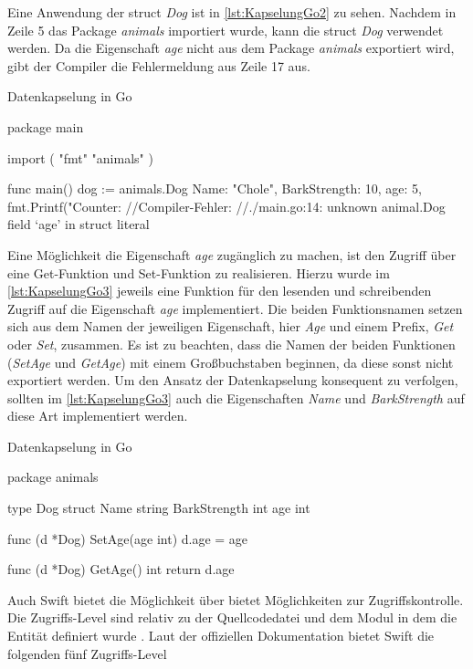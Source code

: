 Eine Anwendung der struct \emph{Dog} ist in \autoref{lst:KapselungGo2} zu sehen.
Nachdem in Zeile 5 das Package \emph{animals} importiert wurde, kann die struct \emph{Dog} verwendet werden.
Da die Eigenschaft \emph{age} nicht aus dem Package \emph{animals} exportiert wird, gibt der Compiler die Fehlermeldung aus Zeile 17 aus. 

\begin{listing}[H]
\caption{Datenkapselung in Go \cite[]{Kennedy.GoExport}}
\label{lst:KapselungGo2}
\begin{GoCode}
package main

import (
    "fmt"
    "animals"
)

func main() {
    dog := animals.Dog{
        Name:         "Chole",
        BarkStrength: 10,
        age:          5,
    }
    fmt.Printf("Counter: %
}
//Compiler-Fehler: 
//./main.go:14: unknown animal.Dog field ‘age’ in struct literal
\end{GoCode}
\end{listing}

Eine Möglichkeit die Eigenschaft \emph{age} zugänglich zu machen, ist den Zugriff über eine Get-Funktion und Set-Funktion zu realisieren.
Hierzu wurde im \autoref{lst:KapselungGo3} jeweils eine Funktion für den lesenden und schreibenden Zugriff auf die Eigenschaft \emph{age} implementiert. 
Die beiden Funktionsnamen setzen sich aus dem Namen der jeweiligen Eigenschaft, hier \emph{Age} und einem Prefix, \emph{Get} oder \emph{Set}, zusammen.
Es ist zu beachten, dass die Namen der beiden Funktionen (\emph{SetAge} und \emph{GetAge}) mit einem Großbuchstaben beginnen, da diese sonst nicht exportiert werden. 
Um den Ansatz der Datenkapselung konsequent zu verfolgen, sollten im \autoref{lst:KapselungGo3} auch die Eigenschaften \emph{Name} und \emph{BarkStrength} auf diese Art implementiert werden.   

\begin{listing}[H]
\caption{Datenkapselung in Go}
\label{lst:KapselungGo3}
\begin{GoCode}
package animals

type Dog struct {
    Name string
    BarkStrength int
    age int
}

func (d *Dog) SetAge(age int) {
    d.age = age
}

func (d *Dog) GetAge() int {
    return d.age
}
\end{GoCode}
\end{listing}

Auch Swift bietet die Möglichkeit über bietet Möglichkeiten zur Zugriffskontrolle. 
Die Zugriffs-Level sind relativ zu der Quellcodedatei und dem Modul in dem die Entität definiert wurde \cite[S.394]{Apple.2017}.
Laut der offiziellen Dokumentation \cite[S.394]{Apple.2017} bietet Swift die folgenden fünf Zugriffs-Level

